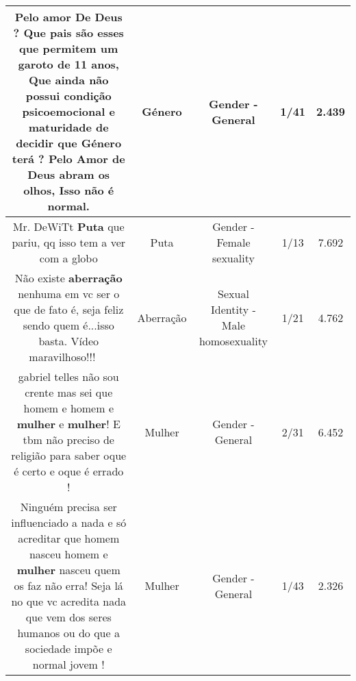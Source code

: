 \documentclass[11pt]{article}
\newlength\mylength
\begin{document}
\begin{center}
\begin{longtable}{|C{.65\mylength}|C{.30\mylength}|C{.12\mylength}|C{.12\mylength}|C{.12\mylength}|}
  \small Pelo amor De Deus ? Que pais são  esses que permitem um garoto de 11 anos, Que ainda não  possui condição psicoemocional e maturidade  de decidir que \textbf{Género}   terá  ? Pelo Amor de Deus  abram os olhos, Isso não é normal.\normalsize   & Género & Gender - General & 1/41 & 2.439 \\  \hline
  \small Mr. DeWiTt \textbf{Puta} que pariu, qq isso tem a ver com a globo\normalsize   & Puta & Gender - Female sexuality & 1/13 & 7.692 \\  \hline
  \small Não existe \textbf{aberração} nenhuma em vc ser o que de fato é, seja feliz sendo quem é...isso basta. Vídeo maravilhoso!!! 👏👏👏\normalsize   & Aberração & Sexual Identity - Male homosexuality & 1/21 & 4.762 \\  \hline
  \small gabriel telles não sou crente mas sei que homem e homem e \textbf{mulher} e \textbf{mulher}! E tbm não preciso de religião para saber oque é certo e oque é errado !\normalsize   & Mulher & Gender - General & 2/31 & 6.452 \\  \hline
  \small Ninguém precisa ser influenciado a nada e só acreditar que homem nasceu homem e \textbf{mulher} nasceu quem os faz não erra! Seja lá no que vc acredita nada que vem dos seres humanos ou do que a sociedade impõe e normal jovem !\normalsize   & Mulher & Gender - General & 1/43 & 2.326 \\  \hline

\end{longtable}
\end{center}
\end{document}
